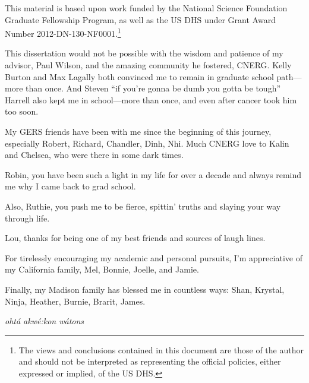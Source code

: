 \footnotesize{ 

This material is based upon work funded by the National Science Foundation Graduate
Fellowship Program, as well as the \gls{US} \gls{DHS} under Grant Award Number
2012-DN-130-NF0001.\footnote{The views and conclusions contained in this
document are those of the author and should not be interpreted as representing
the official policies, either expressed or implied, of the \gls{US} \gls{DHS}.} 

This dissertation would not be possible with the wisdom and patience of my
advisor, Paul Wilson, and the amazing community he fostered, CNERG. Kelly
Burton and Max Lagally both convinced me to remain in graduate school
path---more than once. And Steven ``if you're gonna be dumb you gotta be
tough'' Harrell also kept me in school---more than once, and even after cancer
took him too soon.  

My GERS friends have been with me since the beginning of this journey, especially Robert,
Richard, Chandler, Dinh, Nhi. Much CNERG love to Kalin and Chelsea, who were there in some dark times.

Robin, you have been such a light in my life for over a
decade and always remind me why I came back to grad school.  

Also, Ruthie, you push me to be fierce, spittin' truths and slaying your way
through life.  

Lou, thanks for being one of my best friends and sources of laugh lines. 

For tirelessly encouraging my academic and personal pursuits,
I'm appreciative of my California family, Mel, Bonnie, Joelle, and Jamie. 

Finally, my Madison family has blessed me in countless ways: Shan, Krystal, Ninja, Heather, Burnie, Brarit, James.

\emph{oht\'{a} akw\'{e}:kon w\'{a}tons}
}
